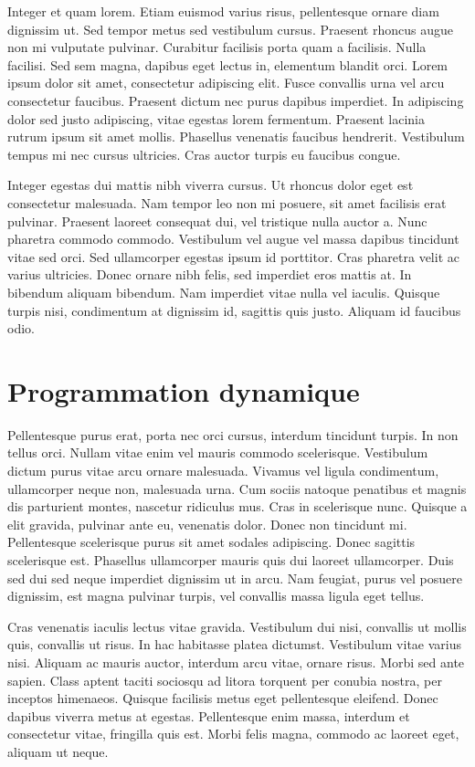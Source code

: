 \documentclass[2pt,a4paper,twoside ]{article}
\begin{document}
\begin{multicols}{2}
Integer et quam lorem. Etiam euismod varius risus, pellentesque ornare diam dignissim ut. Sed tempor metus sed vestibulum cursus. Praesent rhoncus augue non mi vulputate pulvinar. Curabitur facilisis porta quam a facilisis. Nulla facilisi. Sed sem magna, dapibus eget lectus in, elementum blandit orci. Lorem ipsum dolor sit amet, consectetur adipiscing elit. Fusce convallis urna vel arcu consectetur faucibus. Praesent dictum nec purus dapibus imperdiet. In adipiscing dolor sed justo adipiscing, vitae egestas lorem fermentum. Praesent lacinia rutrum ipsum sit amet mollis. Phasellus venenatis faucibus hendrerit. Vestibulum tempus mi nec cursus ultricies. Cras auctor turpis eu faucibus congue.

Integer egestas dui mattis nibh viverra cursus. Ut rhoncus dolor eget est consectetur malesuada. Nam tempor leo non mi posuere, sit amet facilisis erat pulvinar. Praesent laoreet consequat dui, vel tristique nulla auctor a. Nunc pharetra commodo commodo. Vestibulum vel augue vel massa dapibus tincidunt vitae sed orci. Sed ullamcorper egestas ipsum id porttitor. Cras pharetra velit ac varius ultricies. Donec ornare nibh felis, sed imperdiet eros mattis at. In bibendum aliquam bibendum. Nam imperdiet vitae nulla vel iaculis. Quisque turpis nisi, condimentum at dignissim id, sagittis quis justo. Aliquam id faucibus odio.
\section{Programmation dynamique}
Pellentesque purus erat, porta nec orci cursus, interdum tincidunt turpis. In non tellus orci. Nullam vitae enim vel mauris commodo scelerisque. Vestibulum dictum purus vitae arcu ornare malesuada. Vivamus vel ligula condimentum, ullamcorper neque non, malesuada urna. Cum sociis natoque penatibus et magnis dis parturient montes, nascetur ridiculus mus. Cras in scelerisque nunc. Quisque a elit gravida, pulvinar ante eu, venenatis dolor. Donec non tincidunt mi. Pellentesque scelerisque purus sit amet sodales adipiscing. Donec sagittis scelerisque est. Phasellus ullamcorper mauris quis dui laoreet ullamcorper. Duis sed dui sed neque imperdiet dignissim ut in arcu. Nam feugiat, purus vel posuere dignissim, est magna pulvinar turpis, vel convallis massa ligula eget tellus.

Cras venenatis iaculis lectus vitae gravida. Vestibulum dui nisi, convallis ut mollis quis, convallis ut risus. In hac habitasse platea dictumst. Vestibulum vitae varius nisi. Aliquam ac mauris auctor, interdum arcu vitae, ornare risus. Morbi sed ante sapien. Class aptent taciti sociosqu ad litora torquent per conubia nostra, per inceptos himenaeos. Quisque facilisis metus eget pellentesque eleifend. Donec dapibus viverra metus at egestas. Pellentesque enim massa, interdum et consectetur vitae, fringilla quis est. Morbi felis magna, commodo ac laoreet eget, aliquam ut neque.


\end{multicols}
\end{document}
